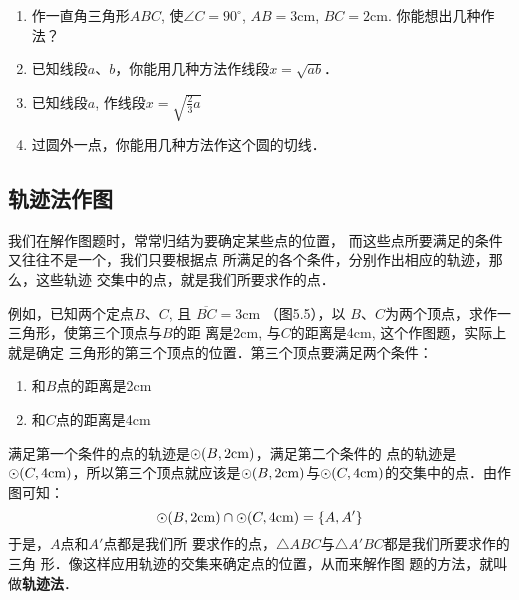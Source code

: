 \begin{ex}
\begin{enumerate}
    \item 作一直角三角形$ABC$, 使$\angle C=90^{\circ}$, $AB=3$cm, $BC=
    2$cm. 你能想出几种作法？
    \item 已知线段$a$、$b$，你能用几种方法作线段$x=\sqrt{ab}$．
    \item 已知线段$a$, 作线段$x=\sqrt{\frac{2}{3}a}$
        \item 过圆外一点，你能用几种方法作这个圆的切线．
\end{enumerate}
\end{ex}

\subsection{轨迹法作图}
我们在解作图题时，常常归结为要确定某些点的位置，
而这些点所要满足的条件又往往不是一个，我们只要根据点
所满足的各个条件，分别作出相应的轨迹，那么，这些轨迹
交集中的点，就是我们所要求作的点．

例如，已知两个定点$B$、$C$, 且
$\overline{BC}=3$cm （图5.5），以
$B$、$C$为两个顶点，求作一三角形，使第三个顶点与$B$的距
离是2cm, 与$C$的距离是4cm, 这个作图题，实际上就是确定
三角形的第三个顶点的位置．第三个顶点要满足两个条件：
\begin{enumerate}
    \item 和$B$点的距离是2cm
    \item 和$C$点的距离是4cm
\end{enumerate}
满足第一个条件的点的轨迹是$\odot(B,2{\rm cm})$，满足第二个条件的
点的轨迹是$\odot (C,4{\rm cm})$，所以第三个顶点就应该是$\odot(B,2{\rm cm})$与$\odot (C,4{\rm cm})$的交集中的点．由作图可知：
\[\odot(B,2{\rm cm})\cap \odot (C,4{\rm cm})=\{A, A'\}\]
于是，$A$点和$A'$点都是我们所
要求作的点，$\triangle ABC$与$\triangle A'BC$都是我们所要求作的三角
形．像这样应用轨迹的交集来确定点的位置，从而来解作图
题的方法，就叫做\textbf{轨迹法}．

